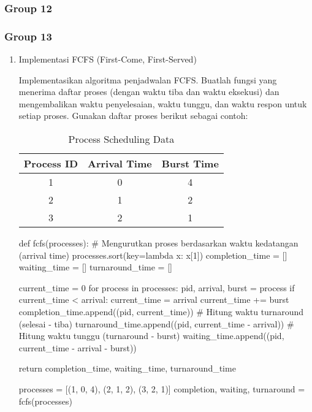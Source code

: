 \documentclass[12pt]{article}
\begin{document}
\subsubsection{Group 12}

\subsubsection{Group 13}
\begin{enumerate}
    \item Implementasi FCFS (First-Come, First-Served)
        \par Implementasikan algoritma penjadwalan FCFS. Buatlah fungsi yang menerima daftar proses (dengan waktu tiba dan waktu eksekusi) dan mengembalikan waktu penyelesaian, waktu tunggu, dan waktu respon untuk setiap proses. Gunakan daftar proses berikut sebagai contoh:
        \begin{table}[h!]
        \centering
        \begin{tabular}{|c|c|c|}
        \hline
        \textbf{Process ID} & \textbf{Arrival Time} & \textbf{Burst Time} \\ \hline
        1 & 0 & 4 \\ \hline
        2 & 1 & 2 \\ \hline
        3 & 2 & 1 \\ \hline
        \end{tabular}
        \caption{Process Scheduling Data}
        \end{table}
        
\begin{python}
def fcfs(processes):
    # Mengurutkan proses berdasarkan waktu kedatangan (arrival time)
    processes.sort(key=lambda x: x[1]) 
    completion_time = []
    waiting_time = []
    turnaround_time = []

    current_time = 0
    for process in processes:
        pid, arrival, burst = process
        if current_time < arrival: 
            current_time = arrival
        current_time += burst
        completion_time.append((pid, current_time))
        # Hitung waktu turnaround (selesai - tiba)
        turnaround_time.append((pid, current_time - arrival))
        # Hitung waktu tunggu (turnaround - burst)
        waiting_time.append((pid, current_time - arrival - burst))

    return completion_time, waiting_time, turnaround_time

processes = [(1, 0, 4), (2, 1, 2), (3, 2, 1)]
completion, waiting, turnaround = fcfs(processes)


\end{python}
\end{enumerate}
\end{document}
